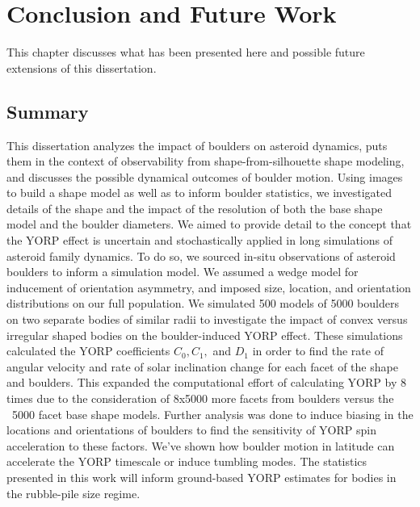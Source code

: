 \chapter{Conclusion and Future Work}
\label{future_work}
This chapter discusses what has been presented here and possible future extensions of this dissertation.

\section{Summary}
This dissertation analyzes the impact of boulders on asteroid dynamics, puts them in the context of observability from shape-from-silhouette shape modeling, and discusses the possible dynamical outcomes of boulder motion. Using images to build a shape model as well as to inform boulder statistics, we investigated details of the shape and the impact of the resolution of both the base shape model and the boulder diameters. We aimed to provide detail to the concept that the YORP effect is uncertain and stochastically applied in long simulations of asteroid family dynamics. To do so, we sourced in-situ observations of asteroid boulders to inform a simulation model. We assumed a wedge model for inducement of orientation asymmetry, and imposed size, location, and orientation distributions on our full population. We simulated 500 models of 5000 boulders on two separate bodies of similar radii to investigate the impact of convex versus irregular shaped bodies on the boulder-induced YORP effect. These simulations calculated the YORP coefficients $C_0, C_1,$ and $D_1$ in order to find the rate of angular velocity and rate of solar inclination change for each facet of the shape and boulders. This expanded the computational effort of calculating YORP by 8 times due to the consideration of 8x5000 more facets from boulders versus the ~5000 facet base shape models. 
Further analysis was done to induce biasing in the locations and orientations of boulders to find the sensitivity of YORP spin acceleration to these factors. We've shown how boulder motion in latitude can accelerate the YORP timescale or induce tumbling modes. The statistics presented in this work will inform ground-based YORP estimates for bodies in the rubble-pile size regime.


